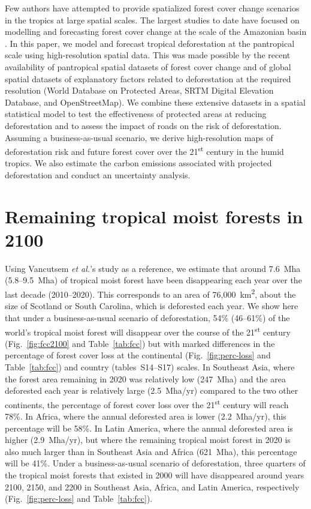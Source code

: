 \documentclass[
  12pt,
]{article}
\begin{document}
Few authors have attempted to provide spatialized forest cover change scenarios in the tropics at large spatial scales. The largest studies to date have focused on modelling and forecasting forest cover change at the scale of the Amazonian basin \citep{Aguiar2016, Swann2015, Soares-Filho2006}. In this paper, we model and forecast tropical deforestation at the pantropical scale using high-resolution spatial data. This was made possible by the recent availability of pantropical spatial datasets of forest cover change \citep{Vancutsem2021} and of global spatial datasets of explanatory factors related to deforestation at the required resolution (World Database on Protected Areas, SRTM Digital Elevation Database, and OpenStreetMap). We combine these extensive datasets in a spatial statistical model to test the effectiveness of protected areas at reducing deforestation and to assess the impact of roads on the risk of deforestation. Assuming a business-as-usual scenario, we derive high-resolution maps of deforestation risk and future forest cover over the 21\textsuperscript{st} century in the humid tropics. We also estimate the carbon emissions associated with projected deforestation and conduct an uncertainty analysis.

\hypertarget{remaining-tropical-moist-forests-in-2100}{%
\section{Remaining tropical moist forests in 2100}\label{remaining-tropical-moist-forests-in-2100}}

Using Vancutsem \emph{et al.}'s study \citep{Vancutsem2021} as a reference, we estimate that around 7.6~Mha (5.8--9.5~Mha) of tropical moist forest have been disappearing each year over the last decade (2010--2020). This corresponds to an area of 76,000~km\textsuperscript{2}, about the size of Scotland or South Carolina, which is deforested each year. We show here that under a business-as-usual scenario of deforestation, 54\% (46--61\%) of the world's tropical moist forest will disappear over the course of the 21\textsuperscript{st} century (Fig.~\ref{fig:fcc2100} and Table~\ref{tab:fcc}) but with marked differences in the percentage of forest cover loss at the continental (Fig.~\ref{fig:perc-loss} and Table~\ref{tab:fcc}) and country (tables~S14--S17) scales. In Southeast Asia, where the forest area remaining in 2020 was relatively low (247~Mha) and the area deforested each year is relatively large (2.5~Mha/yr) compared to the two other continents, the percentage of forest cover loss over the 21\textsuperscript{st} century will reach 78\%. In Africa, where the annual deforested area is lower (2.2~Mha/yr), this percentage will be 58\%. In Latin America, where the annual deforested area is higher (2.9~Mha/yr), but where the remaining tropical moist forest in 2020 is also much larger than in Southeast Asia and Africa (621~Mha), this percentage will be 41\%. Under a business-as-usual scenario of deforestation, three quarters of the tropical moist forests that existed in 2000 will have disappeared around years 2100, 2150, and 2200 in Southeast Asia, Africa, and Latin America, respectively (Fig.~\ref{fig:perc-loss} and Table~\ref{tab:fcc}).\\
\end{document}
